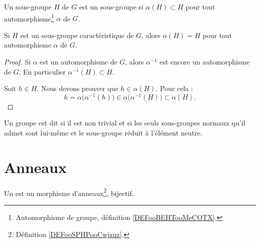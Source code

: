 \begin{definition}      \label{DEFooUXXTooCCLmQe}
	Un sous-groupe \( H\) de \( G\) est un sous-groupe  si \( \alpha(H)\subset H\) pour tout automorphisme\footnote{Automorphisme de groupe, définition \ref{DEFooBEHTooMeCOTX}.} \( \alpha\) de \( G\).
\end{definition}

\begin{lemma}
	Si \( H\) est un sous-groupe caractéristique de \( G\), alors \( \alpha(H)=H\) pour tout automorphisme \( \alpha\) de \( G\).
\end{lemma}

\begin{proof}
	Si \( \alpha\) est un automorphisme de \( G\), alors \( \alpha^{-1}\) est encore un automorphisme de \( G\). En particulier \( \alpha^{-1}(H)\subset H\).

	Soit \( h\in H\). Nous devons prouver que \( h\in \alpha(H)\). Pour cela :
	\begin{equation}
		h=\alpha\big( \alpha^{-1}(h) \big)\in \alpha\big( \alpha^{-1}(H) \big)\subset\alpha(H).
	\end{equation}
\end{proof}

\begin{definition}                 \label{DefGroupeSimple}
	Un groupe est dit  si il est non trivial et si les seuls sous-groupes normaux qu'il admet sont lui-même et le sous-groupe réduit à l'élément neutre.
\end{definition}

\section{Anneaux}

\begin{definition}      \label{DEFooKWKGooIOwGTA}
	Un  est un morphisme d'anneaux\footnote{Définition \ref{DEFooSPHPooCwjzuz}.}, bijectif.
\end{definition}

